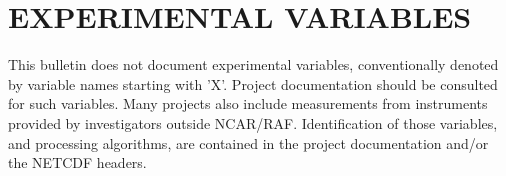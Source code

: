 
\section{EXPERIMENTAL VARIABLES}

This bulletin does not document experimental variables, conventionally
denoted by variable names starting with 'X'. Project documentation
should be consulted for such variables. Many projects also include
measurements from instruments provided by investigators outside NCAR/RAF.
Identification of those variables, and processing algorithms, are
contained in the project documentation and/or the NETCDF headers. 
